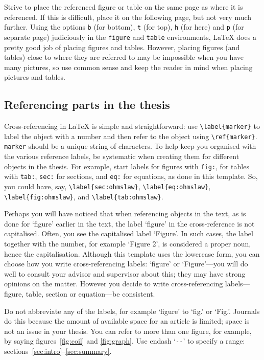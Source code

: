 \documentclass[english, 12pt, a4paper, biz, utf8, a-2b, online]{aaltothesis}
\begin{document}
Strive to place the referenced figure or table on the same page as where it is 
referenced. If this is difficult, place it on the following page, but not very 
much further. Using the options \texttt{b} (for bottom), \texttt{t} (for top), 
\texttt{h} (for here) and \texttt{p} (for separate page) judiciously in the 
\texttt{figure} and \texttt{table} environments, \LaTeX{} does a pretty good 
job of placing figures and tables. However, placing figures (and tables) close 
to where they are referred to may be impossible when you have many pictures, so 
use common sense and keep the reader in mind when placing pictures and tables.


\subsection{Referencing parts in the thesis}

Cross-referencing in \LaTeX{} is simple and straightforward: use 
\verb+\label{marker}+ to label the object with a number and then refer to the 
object using \verb+\ref{marker}+. \texttt{marker} should be a unique string of 
characters. To help keep you organised with the various reference labels, be 
systematic when creating them for different objects in the thesis. For example, 
start labels for figures with \texttt{fig:}, for tables with \texttt{tab:}, 
\texttt{sec:} for sections, and \texttt{eq:} for equations, as done in this 
template. So, you could have, say, \verb+\label{sec:ohmslaw}+, 
\verb+\label{eq:ohmslaw}+, \verb+\label{fig:ohmslaw}+, and 
\verb+\label{tab:ohmslaw}+.

Perhaps you will have noticed that when referencing objects in the text, as is 
done for `figure' earlier in the text, the label ‘figure’ in the cross-reference
is not capitalised. Often, you see the capitalised label ‘Figure’. In such 
cases, the label together with the number, for example ‘Figure 2’, is 
considered a proper noun, hence the capitalisation. Although this template uses 
the lowercase form, you can choose how you write cross-referencing labels: 
‘figure’ or ‘Figure’---you will do well to consult your advisor and supervisor 
about this; they may have strong opinions on the matter. However you decide to 
write cross-referencing labels---figure, table, section or equation---be 
consistent.

Do not abbreviate any of the labels, for example ‘figure’ to ‘fig.’ or ‘Fig.’. 
Journals do this because the amount of available space for an article is 
limited; space is not an issue in your thesis. You can refer to more than one 
figure, for example, by saying figures~\ref{fig:coil} and \ref{fig:graph}. Use 
endash `\verb+--+' to specify a range: sections~\ref{sec:intro}--\ref{sec:summary}.
\end{document}
